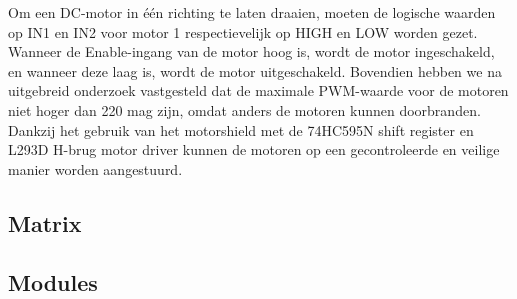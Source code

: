 Om een DC-motor in één richting te laten draaien, moeten de logische waarden op IN1 en IN2 voor motor 1 respectievelijk op HIGH en LOW worden gezet. Wanneer de Enable-ingang van de motor hoog is, wordt de motor ingeschakeld, en wanneer deze laag is, wordt de motor uitgeschakeld. Bovendien hebben we na uitgebreid onderzoek vastgesteld dat de maximale PWM-waarde voor de motoren niet hoger dan 220 mag zijn, omdat anders de motoren kunnen doorbranden. Dankzij het gebruik van het motorshield met de 74HC595N shift register en L293D H-brug motor driver kunnen de motoren op een gecontroleerde en veilige manier worden aangestuurd.

\subsection{Matrix}
\subsection{Modules}
